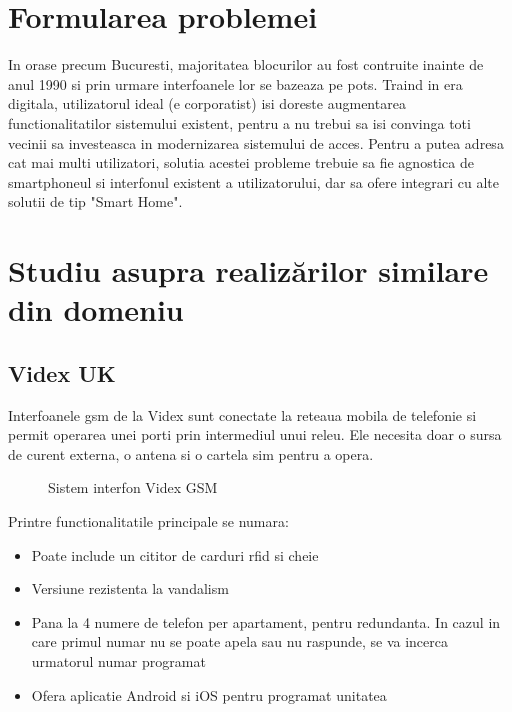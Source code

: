 \section {Formularea problemei}

In orase precum Bucuresti, majoritatea blocurilor au fost contruite inainte de anul 1990 si prin urmare interfoanele lor se bazeaza pe \acrshort{pots}. Traind in era digitala, utilizatorul ideal (e corporatist) isi doreste augmentarea functionalitatilor sistemului existent, pentru a nu trebui sa isi convinga toti vecinii sa investeasca in modernizarea sistemului de acces. Pentru a putea adresa cat mai multi utilizatori, solutia acestei probleme trebuie sa fie agnostica de smartphoneul si interfonul existent a utilizatorului, dar sa ofere integrari cu alte solutii de tip "Smart Home".

\section {Studiu asupra realizărilor similare din domeniu}


\subsection {Videx UK}

Interfoanele \acrshort{gsm} de la Videx sunt conectate la reteaua mobila de telefonie si permit operarea unei porti prin intermediul unui releu. Ele necesita doar o sursa de curent externa, o antena si o cartela \acrfull{sim} pentru a opera.

\begin{figure}[h!]
  \centering
  \caption{Sistem interfon Videx GSM \cite{VidexUk}}
\end{figure}

Printre functionalitatile principale se numara:
\begin{itemize}
  \item Poate include un cititor de carduri \acrshort{rfid} si cheie
  \item Versiune rezistenta la vandalism
  \item Pana la 4 numere de telefon per apartament, pentru redundanta. In cazul in care primul numar nu se poate apela sau nu raspunde, se va incerca urmatorul numar programat
  \item Ofera aplicatie Android si iOS pentru programat unitatea
\end{itemize}

